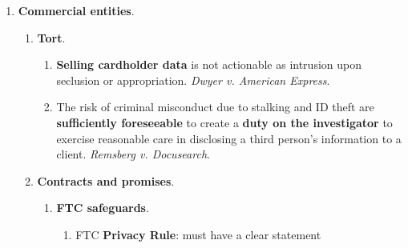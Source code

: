 \begin{enumerate}
\begin{enumerate}
\begin{enumerate}
\begin{enumerate}
                security regulations for regulated entities.
            \end{enumerate}
        \end{enumerate}
        \item \textbf{Identity theft}.
        \begin{enumerate}
            \item Identity Theft Assumption and Deterrence Act: federal, 
            1998\footnote{Casebook p. 786.}---and more than 40 state laws.
            \item Solove: the credit system enables identity theft, e.g., by 
            the frequent use of SSNs as identifiers.\footnote{Casebook p. 
            787--88.}
            \item Identity theft is \textbf{foreseeable} and preventable, so 
            banks have to implement reasonable and cost-effective means to 
            address it. \emph{Wolfe v. MBNA}.
            \item Plaintiffs can recover against credit reporting agencies for 
            emotional distress. \emph{Sloane v. Equifax}.
        \end{enumerate}
    \end{enumerate}
    \item \textbf{Commercial entities}.
    \begin{enumerate}
        \item \textbf{Tort}.
        \begin{enumerate}
            \item \textbf{Selling cardholder data} is not actionable as 
            intrusion upon seclusion or appropriation. \emph{Dwyer v. American 
            Express}.
            \item The risk of criminal misconduct due to stalking and ID theft 
            are \textbf{sufficiently foreseeable} to create a \textbf{duty on 
            the investigator} to exercise reasonable care in disclosing a 
            third person's information to a client. \emph{Remsberg v. 
            Docusearch}.
        \end{enumerate}
        \item \textbf{Contracts and promises}.
        \begin{enumerate}
            \item \textbf{FTC safeguards}.
            \begin{enumerate}
                \item FTC \textbf{Privacy Rule}: must have a clear statement 

\end{enumerate}
\end{enumerate}
\end{enumerate}
\end{enumerate}
